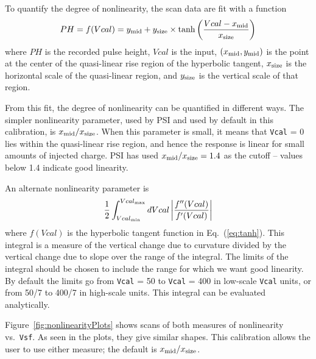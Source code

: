 To quantify the degree of nonlinearity, the scan data are fit with a function
\begin{equation} \label{eq:tanh}
PH = f(Vcal) = y_{\rm mid} + y_{\rm size} \times \tanh \left( \frac{Vcal - x_{\rm mid}}{x_{\rm size}} \right)
\end{equation}
where $PH$ is the recorded pulse height, $Vcal$ is the input, $(x_{\rm mid},y_{\rm mid})$ is the point at the center of the quasi-linear rise region of the hyperbolic tangent, $x_{\rm size}$ is the horizontal scale of the quasi-linear region, and $y_{\rm size}$ is the vertical scale of that region.

From this fit, the degree of nonlinearity can be quantified in different ways.  The simpler nonlinearity parameter, used by PSI and used by default in this calibration, is $x_{\rm mid}/x_{\rm size}$.  When this parameter is small, it means that \verb|Vcal| = 0 lies within the quasi-linear rise region, and hence the response is linear for small amounts of injected charge.  PSI has used $x_{\rm mid}/x_{\rm size} = 1.4$ as the cutoff -- values below 1.4 indicate good linearity.

An alternate nonlinearity parameter is
\begin{equation} \label{eq:nonlinearityIntegral}
\frac{1}{2} \int_{Vcal_{\rm min}}^{Vcal_{\rm max}} dVcal \left| \frac{f''(Vcal)}{f'(Vcal)} \right|
\end{equation}
where $f(Vcal)$ is the hyperbolic tangent function in Eq.~(\ref{eq:tanh}).  This integral is a measure of the vertical change due to curvature divided by the vertical change due to slope over the range of the integral.  The limits of the integral should be chosen to include the range for which we want good linearity.  By default the limits go from \verb|Vcal| = 50 to \verb|Vcal| = 400 in low-scale \verb|Vcal| units, or from 50/7 to 400/7 in high-scale units.  This integral can be evaluated analytically.

Figure~\ref{fig:nonlinearityPlots} shows scans of both measures of nonlinearity vs.~\verb|Vsf|.  As seen in the plots, they give similar shapes.  This calibration allows the user to use either measure; the default is $x_{\rm mid}/x_{\rm size}$.

